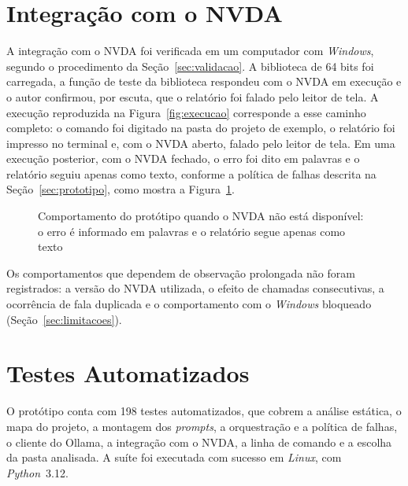 \documentclass[
    12pt,                   %
    openright,              %
    oneside,                %
    a4paper,                %
    sumario=tradicional,    %
    english,                %
    brazil,                 %
    ]{abntex2}
\begin{document}
\section{Integração com o NVDA}\label{sec:resultnvda}

A integração com o NVDA foi verificada em um computador com \textit{Windows}, segundo o procedimento da Seção~\ref{sec:validacao}. A biblioteca de 64 bits foi carregada, a função de teste da biblioteca respondeu com o NVDA em execução e o autor confirmou, por escuta, que o relatório foi falado pelo leitor de tela. A execução reproduzida na Figura~\ref{fig:execucao} corresponde a esse caminho completo: o comando foi digitado na pasta do projeto de exemplo, o relatório foi impresso no terminal e, com o NVDA aberto, falado pelo leitor de tela. Em uma execução posterior, com o NVDA fechado, o erro foi dito em palavras e o relatório seguiu apenas como texto, conforme a política de falhas descrita na Seção~\ref{sec:prototipo}, como mostra a Figura~\ref{fig:semnvda}.

\begin{figure}[htbp]
  \centering
  \caption{Comportamento do protótipo quando o NVDA não está disponível: o erro é informado em palavras e o relatório segue apenas como texto}
  \label{fig:semnvda}
\end{figure}

Os comportamentos que dependem de observação prolongada não foram registrados: a versão do NVDA utilizada, o efeito de chamadas consecutivas, a ocorrência de fala duplicada e o comportamento com o \textit{Windows} bloqueado (Seção~\ref{sec:limitacoes}).

\section{Testes Automatizados}\label{sec:resulttestes}

O protótipo conta com 198 testes automatizados, que cobrem a análise estática, o mapa do projeto, a montagem dos \textit{prompts}, a orquestração e a política de falhas, o cliente do Ollama, a integração com o NVDA, a linha de comando e a escolha da pasta analisada. A suíte foi executada com sucesso em \textit{Linux}, com \textit{Python}~3.12.
\end{document}
